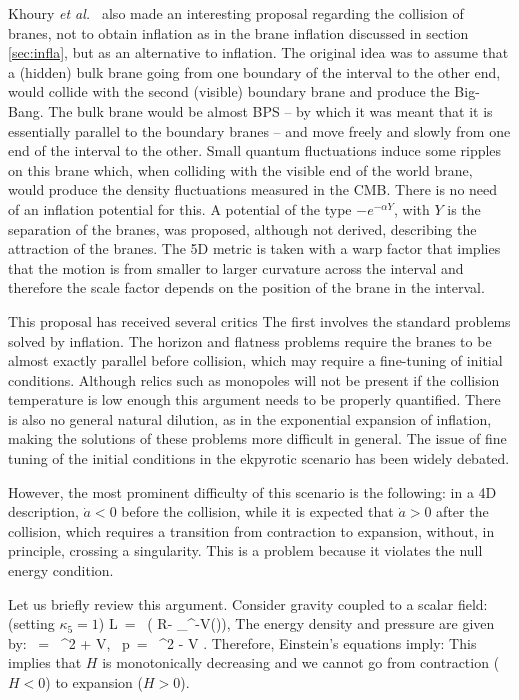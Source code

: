 Khoury {\it et al.~} also made an interesting proposal regarding the collision of branes, not to obtain inflation as in the brane inflation discussed in section \ref{sec:infla}, but as an alternative to inflation. The original idea
was to assume that a (hidden) bulk brane going from one boundary of the interval to the other end, would collide with the second (visible) boundary 
brane and produce the Big-Bang. The bulk brane would be almost BPS -- by which it was 
meant that it is essentially parallel to the boundary branes --  and move freely and slowly from one end of the interval to the other.
Small quantum fluctuations  induce some ripples on this brane which, when colliding with the visible end of the world 
brane, would produce the density fluctuations measured in the CMB. There is 
no need of an inflation potential for this. A potential of the type 
$-e^{-\alpha Y}$, with $Y$ is the separation of the branes, was proposed, although not derived, describing  the attraction of the branes. 
The 5D metric is taken with a warp factor that implies that the
motion is
 from smaller to larger curvature across the interval and therefore the scale 
factor depends on the position of the brane in the interval. 

This proposal has received several critics The first involves 
the standard problems solved by inflation. The horizon and flatness
problems require the  branes to be almost exactly parallel before collision,
which may require a fine-tuning of initial conditions. Although relics such as
monopoles will not be present if the collision temperature is low
enough this argument needs to be properly quantified. There is also no general natural
dilution, as in the exponential expansion of inflation, making the solutions of these problems more
difficult in general.  The issue of fine tuning of
 the initial conditions in the ekpyrotic scenario has been widely debated.

However, the most prominent difficulty of this scenario is the following:
in a 4D description, $\dot a<0$ before the collision, while it is expected that $\dot a>0$ after the collision,
 which requires a transition from contraction to expansion, without, in principle, crossing a 
singularity. This is a problem because it violates the null energy condition.

Let us briefly review this argument. Consider gravity coupled to a scalar field: (setting $\kappa_5=1$) 
\be
{\cal L}\ = \ \left( R- 
\partial_\mu\phi\partial^\mu\phi-V(\phi)\right),
\ee
The energy density and pressure are given by:
\be
\rho\ = \ \dot\phi^2 + V, \, \qquad p\ = \ \dot\phi^2 - V .
\ee
Therefore, Einstein's equations imply:
\be
\setlength\fboxsep{0.25cm}
\setlength\fboxrule{0.4pt}
\ee
This implies that $H$ is  monotonically decreasing and 
we cannot go from contraction ($H<0$) to expansion ($H>0$).

